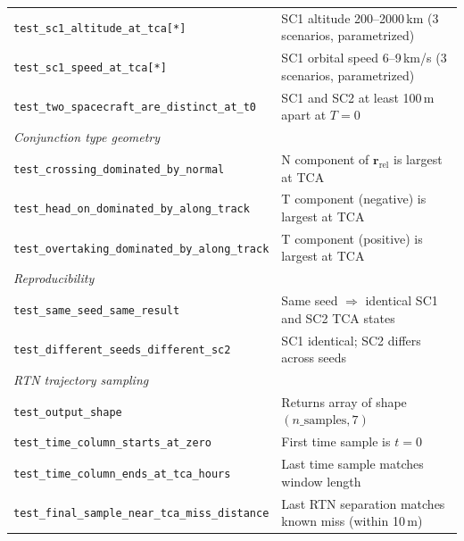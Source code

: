 \documentclass[11pt]{article}
\begin{document}
\begin{table}[htb]
\begin{tabular}{lp{10cm}}
  \texttt{test\_sc1\_altitude\_at\_tca[*]} & SC1 altitude 200--2000\,km (3 scenarios, parametrized) \\
  \texttt{test\_sc1\_speed\_at\_tca[*]} & SC1 orbital speed 6--9\,km/s (3 scenarios, parametrized) \\
  \texttt{test\_two\_spacecraft\_are\_distinct\_at\_t0} & SC1 and SC2 at least 100\,m apart at $T{=}0$ \\
  \midrule
  \multicolumn{2}{l}{\textit{Conjunction type geometry}} \\
  \texttt{test\_crossing\_dominated\_by\_normal} & N component of $\mathbf{r}_\text{rel}$ is largest at TCA \\
  \texttt{test\_head\_on\_dominated\_by\_along\_track} & T component (negative) is largest at TCA \\
  \texttt{test\_overtaking\_dominated\_by\_along\_track} & T component (positive) is largest at TCA \\
  \midrule
  \multicolumn{2}{l}{\textit{Reproducibility}} \\
  \texttt{test\_same\_seed\_same\_result} & Same seed $\Rightarrow$ identical SC1 and SC2 TCA states \\
  \texttt{test\_different\_seeds\_different\_sc2} & SC1 identical; SC2 differs across seeds \\
  \midrule
  \multicolumn{2}{l}{\textit{RTN trajectory sampling}} \\
  \texttt{test\_output\_shape} & Returns array of shape $(n\_\text{samples}, 7)$ \\
  \texttt{test\_time\_column\_starts\_at\_zero} & First time sample is $t=0$ \\
  \texttt{test\_time\_column\_ends\_at\_tca\_hours} & Last time sample matches window length \\
  \texttt{test\_final\_sample\_near\_tca\_miss\_distance} & Last RTN separation matches known miss (within 10\,m) \\
  \bottomrule
\end{tabular}
\end{table}
\end{document}
